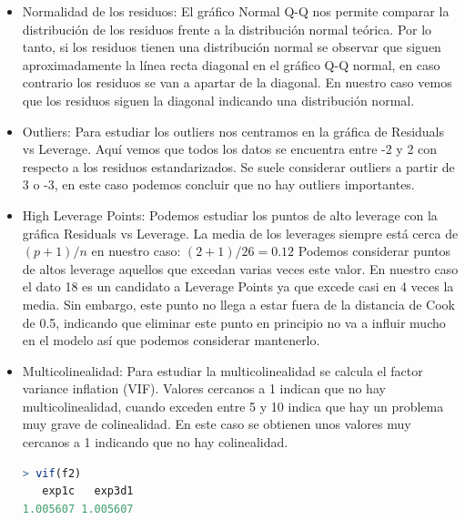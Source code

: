 \documentclass[a4paper]{article}
\begin{document}
\begin{itemize}
    \item Normalidad de los residuos: El gráfico Normal Q-Q nos permite comparar la distribución de los residuos frente a la distribución normal teórica. Por lo tanto, si los residuos tienen una distribución normal se observar que siguen aproximadamente la línea recta diagonal en el gráfico Q-Q normal, en caso contrario los residuos se van a apartar de la diagonal. En nuestro caso vemos que los residuos siguen la diagonal indicando una distribución normal.
    \item Outliers: Para estudiar los outliers nos centramos en la gráfica de Residuals vs Leverage. Aquí vemos que todos los datos se encuentra entre -2 y 2 con respecto a los residuos estandarizados. Se suele considerar outliers a partir de 3 o -3, en este caso podemos concluir que no hay outliers importantes.
    \item High Leverage Points: Podemos estudiar los puntos de alto leverage con la gráfica Residuals vs Leverage. La media de los leverages siempre está cerca de $(p+1)/n$ en nuestro caso: $(2+1)/26 = 0.12$ Podemos considerar puntos de altos leverage aquellos que excedan varias veces este valor. En nuestro caso el dato 18 es un candidato a Leverage Points ya que excede casi en 4 veces la media. Sin embargo, este punto no llega a estar fuera de la distancia de Cook de 0.5, indicando que eliminar este punto en principio no va a influir mucho en el modelo así que podemos considerar mantenerlo.
    \item Multicolinealidad: Para estudiar la multicolinealidad se calcula el factor variance inflation (VIF). Valores cercanos a 1 indican que no hay multicolinealidad, cuando exceden entre 5 y 10 indica que hay un problema muy grave de colinealidad. En este caso se obtienen unos valores muy cercanos a 1 indicando que no hay colinealidad.
\begin{lstlisting}[language=R]
> vif(f2)
   exp1c   exp3d1 
1.005607 1.005607 
\end{lstlisting}

\end{itemize}
\end{document}
